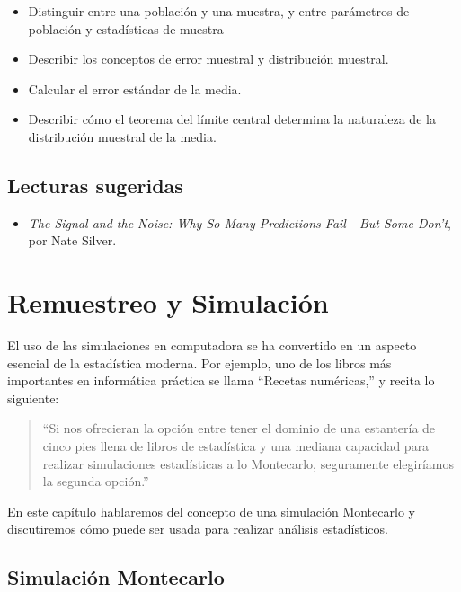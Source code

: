 \documentclass[
  12pt,
]{book}
\providecommand{\tightlist}{%
  \setlength{\itemsep}{0pt}\setlength{\parskip}{0pt}}
\begin{document}
\begin{itemize}
\tightlist
\item
  Distinguir entre una población y una muestra, y entre parámetros de población y estadísticas de muestra
\item
  Describir los conceptos de error muestral y distribución muestral.
\item
  Calcular el error estándar de la media.
\item
  Describir cómo el teorema del límite central determina la naturaleza de la distribución muestral de la media.
\end{itemize}

\hypertarget{lecturas-sugeridas-4}{%
\section{Lecturas sugeridas}\label{lecturas-sugeridas-4}}

\begin{itemize}
\tightlist
\item
  \emph{The Signal and the Noise: Why So Many Predictions Fail - But Some Don't}, por Nate Silver.
\end{itemize}

\hypertarget{resampling-and-simulation}{%
\chapter{Remuestreo y Simulación}\label{resampling-and-simulation}}

El uso de las simulaciones en computadora se ha convertido en un aspecto esencial de la estadística moderna. Por ejemplo, uno de los libros más importantes en informática práctica se llama ``Recetas numéricas,'' y recita lo siguiente:

\begin{quote}
``Si nos ofrecieran la opción entre tener el dominio de una estantería de cinco pies llena de libros de estadística y una mediana capacidad para realizar simulaciones estadísticas a lo Montecarlo, seguramente elegiríamos la segunda opción.''
\end{quote}

En este capítulo hablaremos del concepto de una simulación Montecarlo y discutiremos cómo puede ser usada para realizar análisis estadísticos.

\hypertarget{simulaciuxf3n-montecarlo}{%
\section{Simulación Montecarlo}\label{simulaciuxf3n-montecarlo}}
\end{document}

